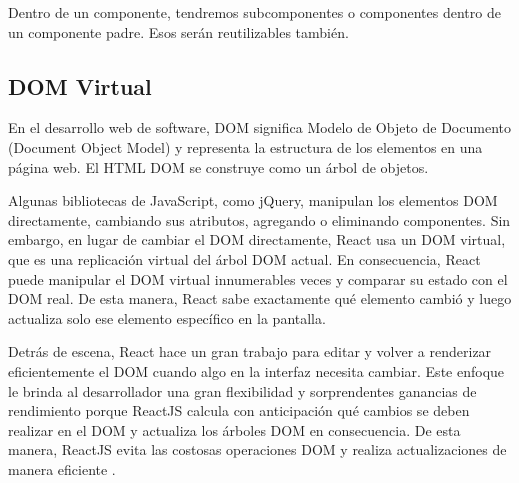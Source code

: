 Dentro de un componente, tendremos subcomponentes o componentes dentro de un componente padre. Esos serán reutilizables también.
\vspace{0.8cm}




\subsection{DOM Virtual}
En el desarrollo web de software, DOM significa Modelo de Objeto de Documento (Document Object Model) y representa la estructura de los elementos en una página web. El HTML DOM se construye como un árbol de objetos.

Algunas bibliotecas de JavaScript, como jQuery, manipulan los elementos DOM directamente, cambiando sus atributos, agregando o eliminando componentes. Sin embargo, en lugar de cambiar el DOM directamente, React usa un DOM virtual, que es una replicación virtual del árbol DOM actual. En consecuencia, React puede manipular el DOM virtual innumerables veces y comparar su estado con el DOM real. De esta manera, React sabe exactamente qué elemento cambió y luego actualiza solo ese elemento específico en la pantalla.

Detrás de escena, React hace un gran trabajo para editar y volver a renderizar eficientemente el DOM cuando algo en la interfaz necesita cambiar. Este enfoque le brinda al desarrollador una gran flexibilidad y sorprendentes ganancias de rendimiento porque ReactJS calcula con anticipación qué cambios se deben realizar en el DOM y actualiza los árboles DOM en consecuencia. De esta manera, ReactJS evita las costosas operaciones DOM y realiza actualizaciones de manera eficiente \cite{stefanov}.